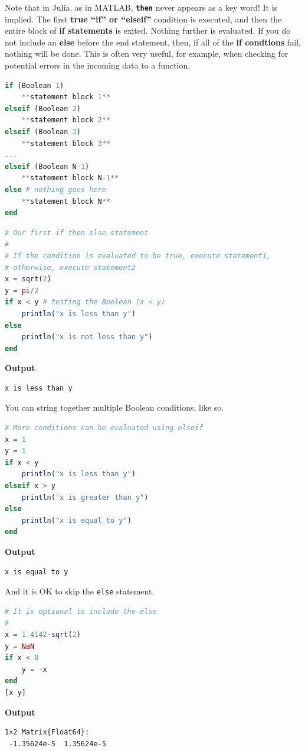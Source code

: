 \begin{rem}
Note that in Julia, as in MATLAB, \texttt{\bf then} never appears as a key word! It is implied. 
The first \textbf{true ``if'' or ``elseif''} condition is executed, and then the entire block of \textbf{if statements} is exited. Nothing further is evaluated. If you do not include an \textbf{else} before the end statement, then, if all of the \textbf{if condtions} fail, nothing will be done. This is often very useful, for example, when checking for potential errors in the incoming data to a function. 
\end{rem}

\begin{lstlisting}[language=Julia,style=mystyle]
if (Boolean 1)
    **statement block 1**
elseif (Boolean 2)
    **statement block 2**
elseif (Boolean 3)
    **statement block 3**
...
elseif (Boolean N-1)
    **statement block N-1**
else # nothing goes here
    **statement block N**
end
\end{lstlisting}



\begin{lstlisting}[language=Julia,style=mystyle]
# Our first if then else statement
#
# If the condition is evaluated to be true, execute statement1, 
# otherwise, execute statement2
x = sqrt(2)
y = pi/2
if x < y # testing the Boolean (x < y)
    println("x is less than y")
else
    println("x is not less than y")
end
\end{lstlisting}
\textbf{Output} 
\begin{verbatim}
x is less than y
\end{verbatim}

You can string together multiple Boolean conditions, like so. 

\begin{lstlisting}[language=Julia,style=mystyle]
# More conditions can be evaluated using elseif
x = 1
y = 1
if x < y
    println("x is less than y")
elseif x > y
    println("x is greater than y")
else
    println("x is equal to y")
end
\end{lstlisting}
\textbf{Output} 
\begin{verbatim}
x is equal to y
\end{verbatim}

And it is OK to skip the \texttt{else} statement. 


\begin{lstlisting}[language=Julia,style=mystyle]
# It is optional to include the else 
#
x = 1.4142-sqrt(2)
y = NaN
if x < 0
    y = -x
end
[x y]
\end{lstlisting}
\textbf{Output} 
\begin{verbatim}
1×2 Matrix{Float64}:
 -1.35624e-5  1.35624e-5
\end{verbatim}

